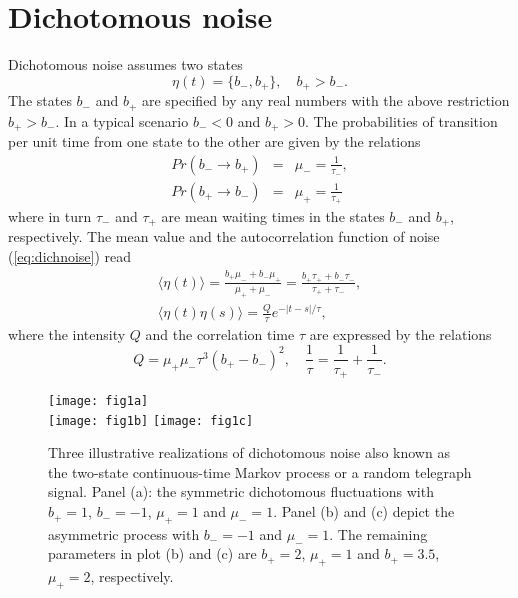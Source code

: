 \documentclass[12pt]{iopart}
\begin{document}
\section{Dichotomous noise}	
Dichotomous noise \cite{BroHan1984,KulCze1996,bena} assumes two states
\begin{equation}
\label{eq:dichnoise}
\eta(t) = \{b_-, b_+\}, \quad b_+>b_-.
\end{equation}
The states  $b_-$ and $b_+$ are specified by any real numbers with the above restriction $b_+>b_-$. In a typical scenario $b_-<0$ and $b_+>0$. The probabilities of transition per unit time from one state to the other are given by the relations
\begin{eqnarray}
\label{eq:dnmuab}
Pr(b_- \to b_+) &=& \mu_- = \frac{1}{\tau_-},\nonumber\\
Pr(b_+ \to b_-) &=& \mu_+ = \frac{1}{\tau_+}
\end{eqnarray}
where in turn $\tau_-$ and $\tau_+$ are mean waiting times in the states $b_-$ and $b_+$, respectively. The mean value and the autocorrelation function of noise (\ref{eq:dichnoise}) read
\begin{eqnarray}
\label{eq:dnmoments}
\langle \eta(t) \rangle = \frac{b_+ \mu_- + b_- \mu_+}{\mu_+ + \mu_-} = \frac{b_+ \tau_{+} + b_- \tau_{-}}{\tau_{+} + \tau_{-}}, \\
\langle \eta(t) \eta(s) \rangle = \frac{Q}{\tau} e^{-|t-s|/\tau}, 
\end{eqnarray}
where the intensity $Q$ and the correlation time $\tau$ are expressed by the relations
\begin{equation}
\label{eq:dnintensity}
Q = \mu_+ \mu_- \tau^3 (b_+ -b_-)^2 , \quad \frac{1}{\tau} = \frac{1}{\tau_+} + \frac{1}{\tau_-}. 
\end{equation}
\begin{figure}[t]
	\centering
	\texttt{[image: fig1a]} \\
	\texttt{[image: fig1b]}
	\texttt{[image: fig1c]}
	\caption{Three illustrative realizations of  dichotomous noise also known as the two-state continuous-time Markov process or a random telegraph signal. Panel (a): the symmetric dichotomous fluctuations with $b_+ = 1$, $b_- = -1$, $\mu_+ = 1$ and $\mu_- = 1$. Panel (b) and (c) depict the asymmetric process with $b_- = -1$ and $\mu_- = 1$. The remaining parameters in plot (b) and (c) are $b_+ = 2$, $\mu_+ = 1$ and $b_+ = 3.5$, $\mu_+ = 2$, respectively.}
	\label{fig1}
\end{figure} 
\end{document}

